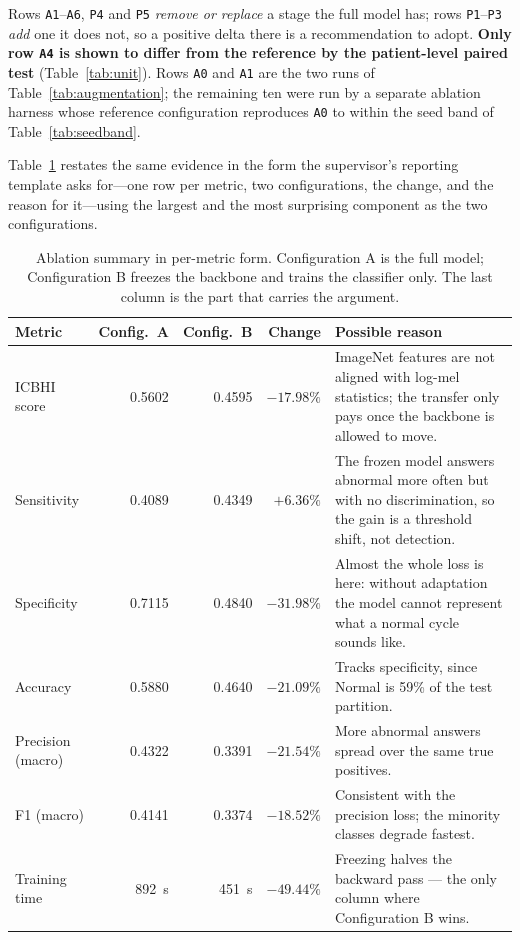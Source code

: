 \documentclass[journal,onecolumn]{IEEEtran}
\begin{document}
\begin{table}[!t]
\vspace{2pt}
\footnotesize Rows \texttt{A1}--\texttt{A6}, \texttt{P4} and \texttt{P5}
\emph{remove or replace} a stage the full model has; rows \texttt{P1}--\texttt{P3}
\emph{add} one it does not, so a positive delta there is a recommendation to adopt.
\textbf{Only row \texttt{A4} is shown to differ from the reference by the
patient-level paired test} (Table~\ref{tab:unit}). Rows \texttt{A0} and
\texttt{A1} are the two runs of Table~\ref{tab:augmentation}; the remaining ten
were run by a separate ablation harness whose reference configuration reproduces
\texttt{A0} to within the seed band of Table~\ref{tab:seedband}.
\end{table}

Table~\ref{tab:ablationreason} restates the same evidence in the form the
supervisor's reporting template asks for---one row per metric, two configurations,
the change, and the reason for it---using the largest and the most surprising
component as the two configurations.

\begin{table}[!t]
\centering
\caption{Ablation summary in per-metric form. Configuration A is the full model;
Configuration B freezes the backbone and trains the classifier only. The last
column is the part that carries the argument.}
\label{tab:ablationreason}
\small
\begin{tabular}{lrrrp{6.6cm}}
\toprule
Metric & Config.\ A & Config.\ B & Change & Possible reason \\
\midrule
ICBHI score & 0.5602 & 0.4595 & $-17.98\%$ & ImageNet features are not aligned with log-mel statistics; the transfer only pays once the backbone is allowed to move. \\
Sensitivity & 0.4089 & 0.4349 & $+6.36\%$ & The frozen model answers abnormal more often but with no discrimination, so the gain is a threshold shift, not detection. \\
Specificity & 0.7115 & 0.4840 & $-31.98\%$ & Almost the whole loss is here: without adaptation the model cannot represent what a normal cycle sounds like. \\
Accuracy & 0.5880 & 0.4640 & $-21.09\%$ & Tracks specificity, since Normal is 59\% of the test partition. \\
Precision (macro) & 0.4322 & 0.3391 & $-21.54\%$ & More abnormal answers spread over the same true positives. \\
F1 (macro) & 0.4141 & 0.3374 & $-18.52\%$ & Consistent with the precision loss; the minority classes degrade fastest. \\
Training time & 892~s & 451~s & $-49.44\%$ & Freezing halves the backward pass --- the only column where Configuration B wins. \\
\bottomrule
\end{tabular}
\end{table}
\end{document}
